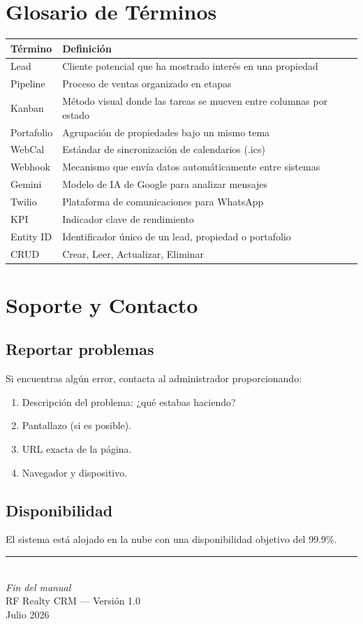 \documentclass[12pt,oneside]{article}
\begin{document}
\section{Glosario de Términos}

\begin{longtable}{|X|X|}
\hline
\rowcolor{primary!10}
\textbf{Término} & \textbf{Definición} \\
\hline
\endhead
Lead & Cliente potencial que ha mostrado interés en una propiedad \\
\hline
Pipeline & Proceso de ventas organizado en etapas \\
\hline
Kanban & Método visual donde las tareas se mueven entre columnas por estado \\
\hline
Portafolio & Agrupación de propiedades bajo un mismo tema \\
\hline
WebCal & Estándar de sincronización de calendarios (.ics) \\
\hline
Webhook & Mecanismo que envía datos automáticamente entre sistemas \\
\hline
Gemini & Modelo de IA de Google para analizar mensajes \\
\hline
Twilio & Plataforma de comunicaciones para WhatsApp \\
\hline
KPI & Indicador clave de rendimiento \\
\hline
Entity ID & Identificador único de un lead, propiedad o portafolio \\
\hline
CRUD & Crear, Leer, Actualizar, Eliminar \\
\hline
\end{longtable}

\section{Soporte y Contacto}

\subsection{Reportar problemas}

Si encuentras algún error, contacta al administrador proporcionando:
\begin{enumerate}[leftmargin=*]
  \item Descripción del problema: ¿qué estabas haciendo?
  \item Pantallazo (si es posible).
  \item URL exacta de la página.
  \item Navegador y dispositivo.
\end{enumerate}

\subsection{Disponibilidad}

El sistema está alojado en la nube con una disponibilidad objetivo del 99.9\%.

\vspace{1cm}
\begin{center}
\rule{5cm}{0.5pt}\\[4pt]
\textit{Fin del manual}\\[2pt]
RF Realty CRM — Versión 1.0\\[2pt]
Julio 2026
\end{center}
\end{document}
